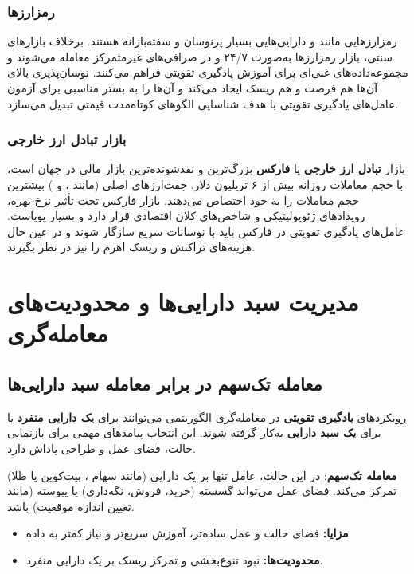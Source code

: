 \documentclass[12pt, a4paper]{report}
\begin{document}
\subsubsection{رمزارزها\protect\footnotemark}

رمزارزهایی مانند  و  دارایی‌هایی بسیار پرنوسان و سفته‌بازانه هستند. برخلاف بازارهای سنتی، بازار رمزارزها به‌صورت ۲۴/۷ و در صرافی‌های غیرمتمرکز معامله می‌شوند و مجموعه‌داده‌های غنی‌ای برای آموزش یادگیری تقویتی فراهم می‌کنند.  
نوسان‌پذیری بالای آن‌ها هم فرصت و هم ریسک ایجاد می‌کند و آن‌ها را به بستر مناسبی برای آزمون عامل‌های یادگیری تقویتی با هدف شناسایی الگوهای کوتاه‌مدت قیمتی تبدیل می‌سازد.  

\subsubsection{بازار تبادل ارز خارجی\protect\footnotemark}
بازار \textbf{تبادل ارز خارجی} یا \textbf{فارکس} بزرگ‌ترین و نقدشونده‌ترین بازار مالی در جهان است، با حجم معاملات روزانه بیش از ۶ تریلیون دلار. جفت‌ارزهای اصلی (مانند ،  و ) بیشترین حجم معاملات را به خود اختصاص می‌دهند.  
بازار فارکس تحت تأثیر نرخ بهره، رویدادهای ژئوپولیتیکی و شاخص‌های کلان اقتصادی قرار دارد و بسیار پویاست. عامل‌های یادگیری تقویتی در فارکس باید با نوسانات سریع سازگار شوند و در عین حال هزینه‌های تراکنش و ریسک اهرم را نیز در نظر بگیرند.  



\section{مدیریت سبد دارایی‌ها و محدودیت‌های معامله‌گری}

\subsection{معامله تک‌سهم\protect{} در برابر معامله سبد دارایی‌ها\protect{}}

رویکردهای \textbf{یادگیری تقویتی} در معامله‌گری الگوریتمی می‌توانند برای \textbf{یک دارایی منفرد} یا برای \textbf{یک سبد دارایی} به‌کار گرفته شوند. این انتخاب پیامدهای مهمی برای بازنمایی حالت، فضای عمل و طراحی پاداش دارد.  

\bigskip
\textbf{معامله تک‌سهم}:  
در این حالت، عامل تنها بر یک دارایی (مانند سهام ، بیت‌کوین یا طلا) تمرکز می‌کند. فضای عمل می‌تواند گسسته (خرید، فروش، نگه‌داری) یا پیوسته (مانند تعیین اندازه موقعیت) باشد.  
\begin{itemize}
    \item \textbf{مزایا:} فضای حالت و عمل ساده‌تر، آموزش سریع‌تر و نیاز کمتر به داده.  
    \item \textbf{محدودیت‌ها:} نبود تنوع‌بخشی و تمرکز ریسک بر یک دارایی منفرد.  
\end{itemize}
\end{document}
